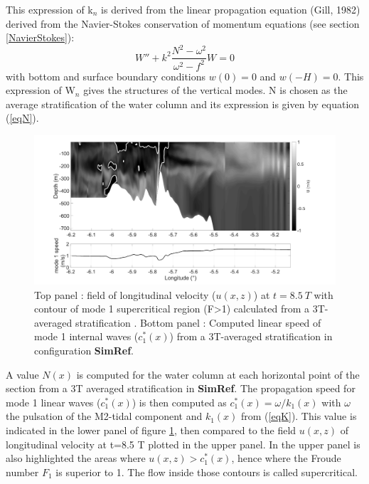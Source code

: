 \documentclass[a4paper,12pt]{article}
\begin{document}
This expression of k$_n$ is derived from the linear propagation equation (Gill, 1982) derived from the Navier-Stokes conservation of momentum equations (see section \ref{NavierStokes}):
\begin{equation}
 W'' + k^2 \frac{N^2 - \omega^2}{\omega ^2 - f^2}W = 0
\end{equation}
with bottom and surface boundary conditions $w(0) = 0$ and $w(-H) = 0$. This expression of W$_n$ gives the structures of the vertical modes. N is chosen as the average stratification of the water column and its expression is given by equation (\ref{eqN}). 

\begin{figure}[!h]
\centering
\includegraphics[width=1\linewidth]{comp_fn_strat.png}
\caption{Top panel : field of longitudinal velocity ($u (x,z)$) at $t = 8.5\ T$ with contour of mode 1 supercritical region (F>1) calculated from a 3T-averaged stratification . Bottom panel : Computed linear speed of mode 1 internal waves ($c^*_1 (x)$) from a 3T-averaged stratification in configuration \textbf{SimRef}.}
\label{fig_annexeF}
\end{figure}

 A value $N (x)$ is computed for the water column at each horizontal point of the section from a 3T averaged stratification in \textbf{SimRef}. The propagation speed for mode 1 linear waves ($c^*_1 (x)$) is then computed as $c^*_1 (x) =\omega / k_1 (x)$ with $\omega$ the pulsation of the M2-tidal component and $k_1 (x)$ from (\ref{eqK}). This value is indicated in the lower panel of figure \ref{fig_annexeF}, then compared to the field $u(x,z)$ of longitudinal velocity at t=8.5 T plotted in the upper panel. In the upper panel is also highlighted the areas where $u(x,z) > c^*_1 (x)$, hence where the Froude number $F_1$ is superior to 1. The flow inside those contours is called supercritical.
\end{document}
